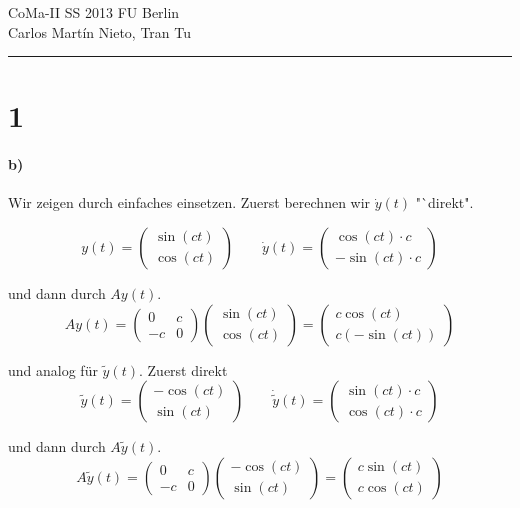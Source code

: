 \documentclass[ngerman,a4paper]{scrartcl}
\begin{document}
{\sffamily
  \hfill
  CoMa-II SS 2013\hfill
  FU Berlin\\[8pt]
  \hfill Carlos Martín Nieto, Tran Tu\hrule \bigskip
}

\section*{1}

\paragraph{b)}

Wir zeigen durch einfaches einsetzen. Zuerst berechnen wir $\dot{y}(t)$ "`direkt".

\[
  y(t) =
  \begin{pmatrix}
    \sin(ct)\\ \cos(ct)
  \end{pmatrix}
  \qquad
  \dot{y}(t) =
  \begin{pmatrix}
    \cos(ct)\cdot c\\ -\sin(ct) \cdot c
  \end{pmatrix}
\]

und dann durch $Ay(t)$.
\[
  Ay(t) =
  \begin{pmatrix}
    0 & c\\ -c & 0
  \end{pmatrix}
  \begin{pmatrix}
    \sin(ct)\\ \cos(ct)
  \end{pmatrix} =
  \begin{pmatrix}
    c \cos(ct)\\ c (-\sin(ct))
  \end{pmatrix}
\]

und analog für $\tilde{y}(t)$. Zuerst direkt
\[
  \tilde{y}(t) =
  \begin{pmatrix}
    -\cos(ct)\\ \sin(ct)
  \end{pmatrix}
  \qquad
  \dot{\tilde{y}}(t) =
  \begin{pmatrix}
    \sin(ct) \cdot c\\ \cos(ct)\cdot c
  \end{pmatrix}
\]

und dann durch $A\tilde{y}(t)$.
\[
  A\tilde{y}(t) =
  \begin{pmatrix}
    0 & c\\ -c & 0
  \end{pmatrix}
  \begin{pmatrix}
    -\cos(ct)\\ \sin(ct)
  \end{pmatrix} =
  \begin{pmatrix}
    c \sin(ct) \\ c \cos(ct)
  \end{pmatrix}
\]
\end{document}
